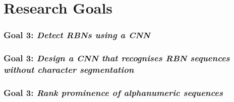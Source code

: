 \section{Research Goals}


\subsubsection*{Goal 3: \itshape Detect RBNs using a CNN}




\blindtext


\subsubsection*{Goal 3: \itshape Design a CNN that recognises RBN sequences without character segmentation}



\blindtext


\subsubsection*{Goal 3: \itshape Rank prominence of alphanumeric sequences}


\blindtext

